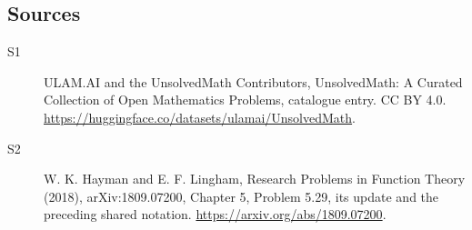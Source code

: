 \documentclass[11pt]{article}
\begin{document}
\subsection{Sources}
\begin{description}
\item[\hypertarget{source:statement:1}{S1}] ULAM.AI and the UnsolvedMath Contributors, UnsolvedMath: A Curated Collection of Open Mathematics Problems, catalogue entry. CC BY 4.0. \url{https://huggingface.co/datasets/ulamai/UnsolvedMath}.
\item[\hypertarget{source:statement:2}{S2}] W. K. Hayman and E. F. Lingham, Research Problems in Function Theory (2018), arXiv:1809.07200, Chapter 5, Problem 5.29, its update and the preceding shared notation. \url{https://arxiv.org/abs/1809.07200}.
\end{description}
\label{end:statement}
\end{document}

